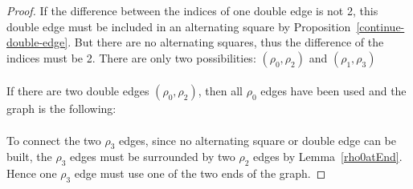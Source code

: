 \begin{proof}
  If the difference between the indices of one double edge is not 2, this double edge must be included in an alternating square by Proposition~\ref{continue-double-edge}. But there are no alternating squares, thus the difference of the indices must be 2. There are only two possibilities: $(\rho_0, \rho_2)$ and $(\rho_1, \rho_3)$

  \paragraph{}
  If there are two double edges $(\rho_0, \rho_2)$, then all $\rho_0$ edges have been used and the graph is the following:

  \begin{figure}[H]
    \begin{center}
      \caption{}
    \end{center}
  \end{figure}

  \paragraph{}
  To connect the two $\rho_3$ edges, since no alternating square or double edge can be built, the $\rho_3$ edges must be surrounded by two $\rho_2$ edges by Lemma~\ref{rho0atEnd}. Hence one $\rho_3$ edge must use one of the two ends of the graph.


\end{proof}
